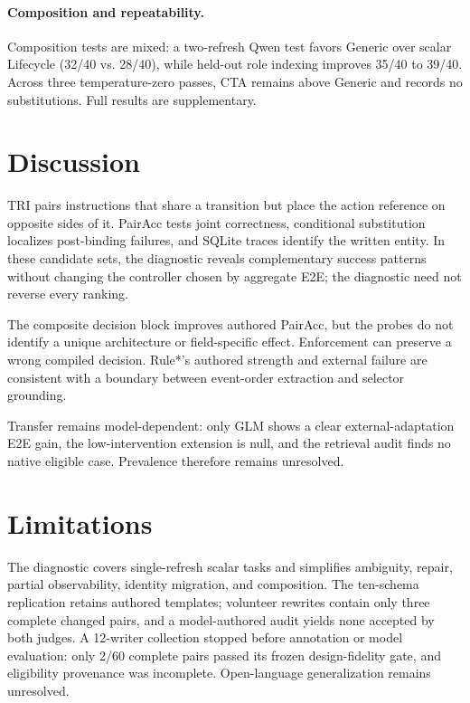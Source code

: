 \documentclass[letterpaper]{article}
\begin{document}
\paragraph{Composition and repeatability.}
Composition tests are mixed: a two-refresh Qwen test favors Generic over scalar Lifecycle (32/40
vs. 28/40), while held-out role indexing improves 35/40 to 39/40. Across three temperature-zero
passes, CTA remains above Generic and records no substitutions. Full results are supplementary.

\section{Discussion}

TRI pairs instructions that share a transition but place the action reference on opposite sides of
it. PairAcc tests joint correctness, conditional substitution localizes post-binding failures, and
SQLite traces identify the written entity. In these candidate sets, the diagnostic reveals
complementary success patterns without changing the controller chosen by aggregate E2E; the
diagnostic need not reverse every ranking.

The composite decision block improves authored PairAcc, but the probes do not identify a unique
architecture or field-specific effect. Enforcement can preserve a wrong compiled decision. Rule*'s
authored strength and external failure are consistent with a boundary between event-order
extraction and selector grounding.

Transfer remains model-dependent: only GLM shows a clear external-adaptation E2E gain, the
low-intervention extension is null, and the retrieval audit finds no native eligible case.
Prevalence therefore remains unresolved.

\section{Limitations}

The diagnostic covers single-refresh scalar tasks and simplifies ambiguity, repair, partial
observability, identity migration, and composition. The ten-schema replication retains authored
templates; volunteer rewrites contain only three complete changed pairs, and a model-authored audit
yields none accepted by both judges. A 12-writer collection stopped before annotation or model
evaluation: only 2/60 complete pairs passed its frozen design-fidelity gate, and eligibility
provenance was incomplete. Open-language generalization remains unresolved.
\end{document}
